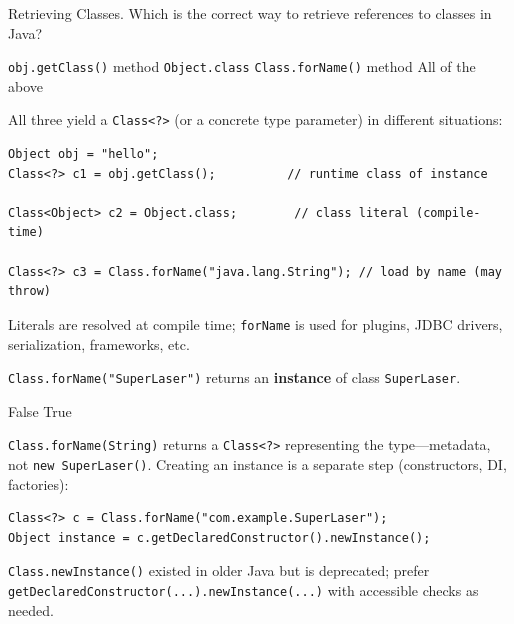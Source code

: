 



\question[4]
Retrieving Classes. Which is the correct way to retrieve references to classes in Java?
\begin{choices}
  \choice \texttt{obj.getClass()} method
  \choice \texttt{Object.class}
  \choice \texttt{Class.forName()} method
  \CorrectChoice All of the above
\end{choices}
\begin{solution}
  All three yield a \texttt{Class<?>} (or a concrete type parameter) in different situations:

\begin{lstlisting}[style=javaexam]
Object obj = "hello";
Class<?> c1 = obj.getClass();          // runtime class of instance

Class<Object> c2 = Object.class;        // class literal (compile-time)

Class<?> c3 = Class.forName("java.lang.String"); // load by name (may throw)
\end{lstlisting}

  Literals are resolved at compile time; \texttt{forName} is used for plugins, JDBC drivers, serialization, frameworks, etc.
\end{solution}

\question[4]
\lstinline!Class.forName("SuperLaser")! returns an \textbf{instance} of class \texttt{SuperLaser}.
\begin{choices}
  \CorrectChoice False
  \choice True
\end{choices}
\begin{solution}
  \texttt{Class.forName(String)} returns a \texttt{Class<?>} representing the type---metadata, not \texttt{new SuperLaser()}. Creating an instance is a separate step (constructors, DI, factories):

\begin{lstlisting}[style=javaexam]
Class<?> c = Class.forName("com.example.SuperLaser");
Object instance = c.getDeclaredConstructor().newInstance();
\end{lstlisting}

  \texttt{Class.newInstance()} existed in older Java but is deprecated; prefer \texttt{getDeclaredConstructor(...).newInstance(...)} with accessible checks as needed.
\end{solution}


